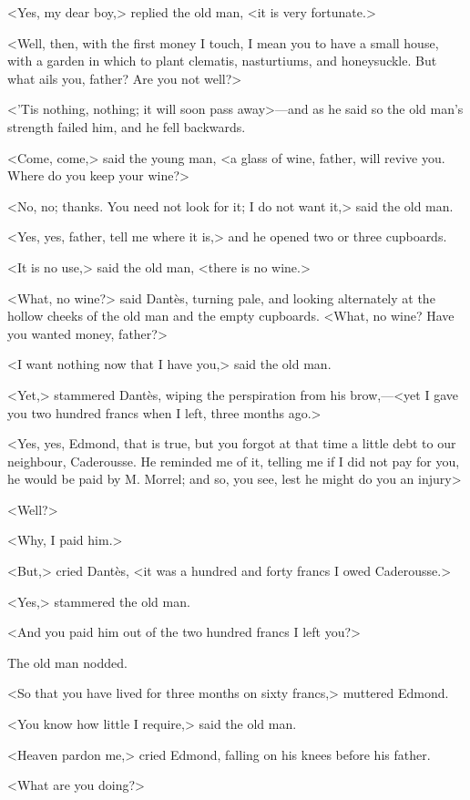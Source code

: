  <Yes, my dear boy,> replied the old man, <it is very fortunate.> 

 <Well, then, with the first money I touch, I mean you to have a small house, with a garden in which to plant clematis, nasturtiums, and honeysuckle. But what ails you, father? Are you not well?> 

 <'Tis nothing, nothing; it will soon pass away>—and as he said so the old man's strength failed him, and he fell backwards. 

 <Come, come,> said the young man, <a glass of wine, father, will revive you. Where do you keep your wine?> 

 <No, no; thanks. You need not look for it; I do not want it,> said the old man. 

 <Yes, yes, father, tell me where it is,> and he opened two or three cupboards. 

 <It is no use,> said the old man, <there is no wine.> 

 <What, no wine?> said Dantès, turning pale, and looking alternately at the hollow cheeks of the old man and the empty cupboards. <What, no wine? Have you wanted money, father?> 

 <I want nothing now that I have you,> said the old man. 

 <Yet,> stammered Dantès, wiping the perspiration from his brow,—<yet I gave you two hundred francs when I left, three months ago.> 

 <Yes, yes, Edmond, that is true, but you forgot at that time a little debt to our neighbour, Caderousse. He reminded me of it, telling me if I did not pay for you, he would be paid by M. Morrel; and so, you see, lest he might do you an injury\longdash> 

 <Well?> 

 <Why, I paid him.> 

 <But,> cried Dantès, <it was a hundred and forty francs I owed Caderousse.> 

 <Yes,> stammered the old man. 

 <And you paid him out of the two hundred francs I left you?> 

 The old man nodded. 

 <So that you have lived for three months on sixty francs,> muttered Edmond. 

 <You know how little I require,> said the old man. 

 <Heaven pardon me,> cried Edmond, falling on his knees before his father. 

 <What are you doing?> 

